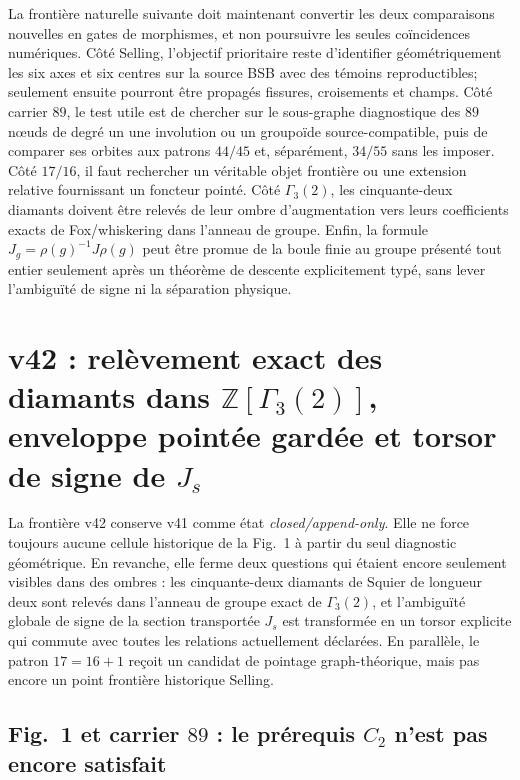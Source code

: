 \documentclass[11pt,a4paper]{article}
\begin{document}
La frontière naturelle suivante doit maintenant convertir les deux comparaisons nouvelles en gates de morphismes, et non poursuivre les seules coïncidences numériques. Côté Selling, l'objectif prioritaire reste d'identifier géométriquement les six axes et six centres sur la source BSB avec des témoins reproductibles; seulement ensuite pourront être propagés fissures, croisements et champs. Côté carrier $89$, le test utile est de chercher sur le sous-graphe diagnostique des $89$ nœuds de degré un une involution ou un groupoïde source-compatible, puis de comparer ses orbites aux patrons $44/45$ et, séparément, $34/55$ sans les imposer. Côté $17/16$, il faut rechercher un véritable objet frontière ou une extension relative fournissant un foncteur pointé. Côté $\Gamma_3(2)$, les cinquante-deux diamants doivent être relevés de leur ombre d'augmentation vers leurs coefficients exacts de Fox/whiskering dans l'anneau de groupe. Enfin, la formule $J_g=\rho(g)^{-1}J\rho(g)$ peut être promue de la boule finie au groupe présenté tout entier seulement après un théorème de descente explicitement typé, sans lever l'ambiguïté de signe ni la séparation physique.



\section{v42 : relèvement exact des diamants dans $\mathbb Z[\Gamma_3(2)]$, enveloppe pointée gardée et torsor de signe de $J_s$}\label{sec:v42-groupring-envelope-sign}

La frontière v42 conserve v41 comme état \emph{closed/append-only}. Elle ne force toujours aucune cellule historique de la Fig.~1 à partir du seul diagnostic géométrique. En revanche, elle ferme deux questions qui étaient encore seulement visibles dans des ombres : les cinquante-deux diamants de Squier de longueur deux sont relevés dans l'anneau de groupe exact de $\Gamma_3(2)$, et l'ambiguïté globale de signe de la section transportée $J_s$ est transformée en un torsor explicite qui commute avec toutes les relations actuellement déclarées. En parallèle, le patron $17=16+1$ reçoit un candidat de pointage graph-théorique, mais pas encore un point frontière historique Selling.

\subsection{Fig.~1 et carrier $89$ : le prérequis $C_2$ n'est pas encore satisfait}
\end{document}
